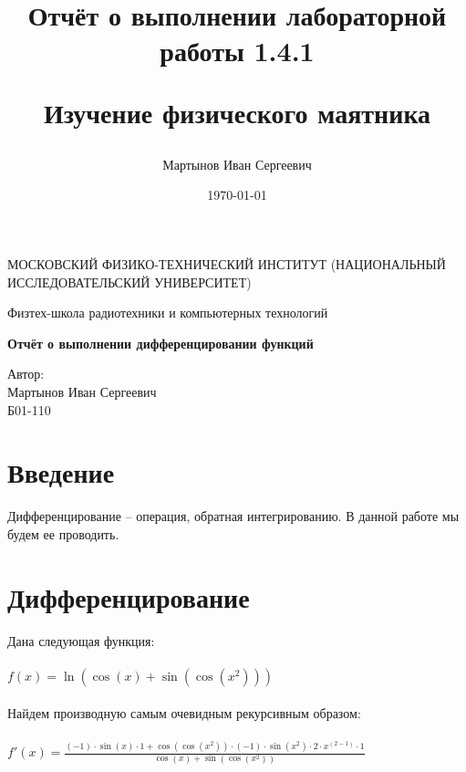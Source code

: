 \documentclass[a4paper,12pt]{article} %
\author{Мартынов Иван Сергеевич}
\title{ Отчёт о выполнении лабораторной работы 1.4.1

Изучение физического маятника
}
\date{\today}
\begin{document}
\begin{titlepage}
\begin{center}
{\large МОСКОВСКИЙ ФИЗИКО-ТЕХНИЧЕСКИЙ ИНСТИТУТ (НАЦИОНАЛЬНЫЙ ИССЛЕДОВАТЕЛЬСКИЙ УНИВЕРСИТЕТ)}
\end{center}
\begin{center}
{\large Физтех-школа радиотехники и компьютерных технологий}
\end{center}


\vspace{4.5cm}
{\huge
\begin{center}
{\bf Отчёт о выполнении дифференцировании функций}
\end{center}
}
\vspace{2cm}
\begin{center}
{\LARGE Автор:\\ Мартынов Иван Сергеевич \\
\vspace{0.2cm}
Б01-110}
\end{center}
\end{titlepage}


\section{Введение}

Дифференцирование -- операция, обратная интегрированию. В данной работе мы будем ее проводить.

\section{Дифференцирование}

Дана следующая функция:\\ 
 \hspace{1cm}\\ 
 

$ f(x) =  \ln\left( \cos\left({x} \right) +  \sin\left( \cos\left({x} ^ {{2}} \right) \right) \right) $\\ 
 \hspace{1cm}\\ 
 

Найдем производную самым очевидным рекурсивным образом:\\ 
 \hspace{1cm}\\ 
 

$ f'(x) =  \frac{ \left(-1\right) \cdot  \sin\left({x} \right) \cdot {1} +  \cos\left( \cos\left({x} ^ {{2}} \right) \right) \cdot \left(-1\right) \cdot  \sin\left({x} ^ {{2}} \right) \cdot {2} \cdot {x} ^ { {\left( {2} - {1} \right)} } \cdot {1} }{  \cos\left({x} \right) +  \sin\left( \cos\left({x} ^ {{2}} \right) \right) }  $\\ 
 \hspace{1cm}\\ 
 
\end{document}

